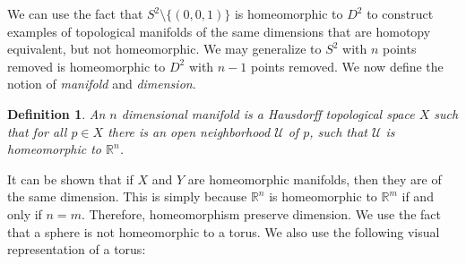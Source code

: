 \documentclass[oneside]{book}
\theoremstyle{mystyle}
\newtheorem{definition}{Definition}[section]
\begin{document}
We can use the fact that $S^{2}\setminus \{(0,0,1)\}$ is homeomorphic to $D^{2}$ to construct examples of topological manifolds of the same dimensions that are homotopy equivalent, but not homeomorphic. We may generalize to $S^{2}$ with $n$ points removed is homeomorphic to $D^{2}$ with $n-1$ points removed. We now define the notion of \textit{manifold} and \textit{dimension}.
\begin{definition}
An $n$ dimensional manifold is a Hausdorff topological space $X$ such that for all $p\in X$ there is an open neighborhood $\mathcal{U}$ of $p$, such that $\mathcal{U}$ is homeomorphic to $\mathbb{R}^{n}$.
\end{definition}
It can be shown that if $X$ and $Y$ are homeomorphic manifolds, then they are of the same dimension. This is simply because $\mathbb{R}^{n}$ is homeomorphic to $\mathbb{R}^{m}$ if and only if $n=m$. Therefore, homeomorphism preserve dimension. We use the fact that a sphere is not homeomorphic to a torus. We also use the following visual representation of a torus:
\end{document}
